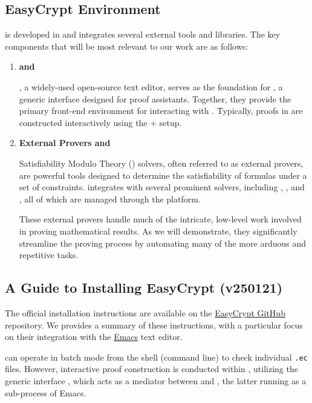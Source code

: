 \subsection{EasyCrypt Environment}
\EasyCrypt is developed in \OCaml and integrates several external tools and libraries. The key components that will be most relevant to our work are as follows:

\begin{enumerate}
	\item \textbf{\Emacs and \ProofGeneral}
	
	\Emacs, a widely-used open-source text editor, serves as the foundation for \ProofGeneral, a generic interface designed for proof assistants. Together, they provide the primary front-end environment for interacting with \EasyCrypt. Typically, proofs in \EasyCrypt are constructed interactively using the \Emacs + \ProofGeneral setup.
	\item \textbf{External Provers and \WhyThree}
	
	Satisfiability Modulo Theory (\SMT) solvers, often referred to as external provers, are powerful tools designed to determine the satisfiability of formulas under a set of constraints. \EasyCrypt integrates with several prominent \SMT solvers, including \AltErgo, \ZThree, and \CVCFour, all of which are managed through the \WhyThree platform.
	
	These external provers handle much of the intricate, low-level work involved in proving mathematical results. As we will demonstrate, they significantly streamline the proving process by automating many of the more arduous and repetitive tasks.
\end{enumerate}

\subsection{A Guide to Installing EasyCrypt (v250121)}
The official \EasyCrypt installation instructions are available on the \hyperref{https://github.com/EasyCrypt/easycrypt}{github}{ec}{EasyCrypt GitHub} repository. We provides a summary of these instructions, with a particular focus on their integration with the \hyperref{https://www.gnu.org/software/emacs/}{site}{emacs}{Emacs} text editor.\par
\EasyCrypt can operate in batch mode from the shell (command line) to check individual \texttt{.ec} files. However, interactive proof construction is conducted within \Emacs, utilizing the generic interface \ProofGeneral, which acts as a mediator between \Emacs and \EasyCrypt, the latter running as a sub-process of Emacs.

